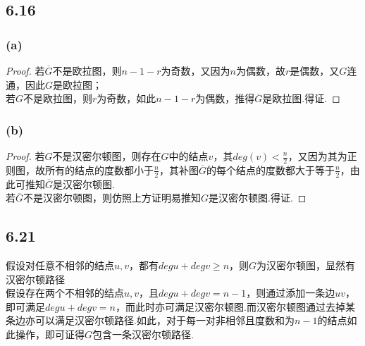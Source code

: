 \documentclass[twocolumn]{article}
\newenvironment{SChinese}{%
	\CJKfamily{gbsn}%
	\CJKtilde
	\CJKnospace}{}
\begin{document}
\begin{CJK}{UTF8}{}
\begin{SChinese}
				\subsection*{6.16}
					\subsubsection*{(a)}
						\begin{proof}
							若$\overline{G}$不是欧拉图，则$n-1-r$为奇数，又因为$n$为偶数，故$r$是偶数，又$G$连通，因此$G$是欧拉图；\\
							若$G$不是欧拉图，则$r$为奇数，如此$n-1-r$为偶数，推得$\overline{G}$是欧拉图.得证.
						\end{proof}
					\subsubsection*{(b)}
						\begin{proof}
							若$G$不是汉密尔顿图，则存在$G$中的结点$v$，其$deg(v)<\frac{n}{2}$，又因为其为正则图，故所有的结点的度数都小于$\frac{n}{2}$，其补图$\overline{G}$的每个结点的度数都大于等于$\frac{n}{2}$，由此可推知$\overline{G}$是汉密尔顿图.\\
							若$\overline{G}$不是汉密尔顿图，则仿照上方证明易推知$G$是汉密尔顿图.得证.
						\end{proof}
				\subsection*{6.21}
					假设对任意不相邻的结点$u,v$，都有$degu+degv\ge n$，则$G$为汉密尔顿图，显然有汉密尔顿路径\\
					假设存在两个不相邻的结点$u,v$，且$degu+degv=n-1$，则通过添加一条边$uv$，即可满足$degu+degv=n$，而此时亦可满足汉密尔顿图.而汉密尔顿图通过去掉某条边亦可以满足汉密尔顿路径.如此，对于每一对非相邻且度数和为$n-1$的结点如此操作，即可证得$G$包含一条汉密尔顿路径.
			
		\end{SChinese}
	\end{CJK}
\end{document}
